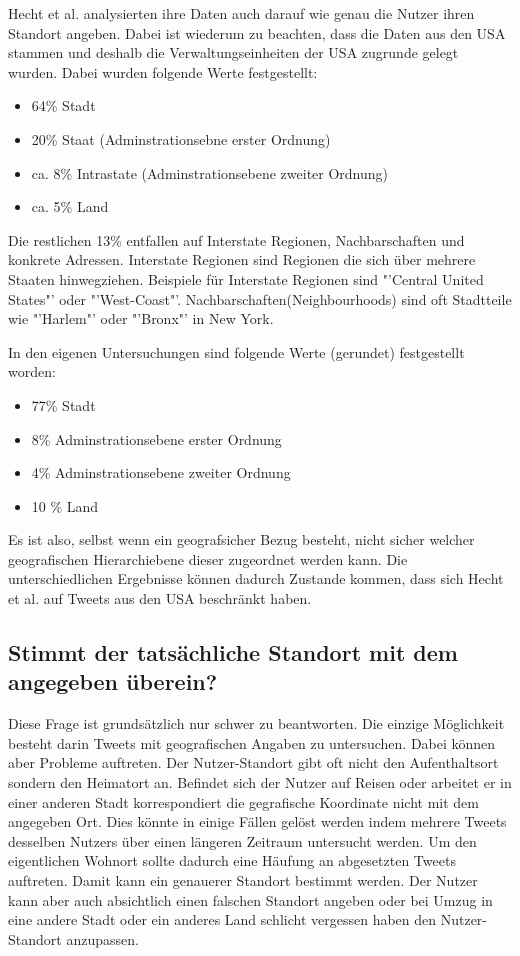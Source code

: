 			Hecht et al. analysierten ihre Daten auch darauf wie genau die Nutzer ihren Standort angeben.
			Dabei ist wiederum zu beachten, dass die Daten aus den USA stammen und deshalb die Verwaltungseinheiten der USA zugrunde gelegt wurden.
			Dabei wurden folgende Werte festgestellt:

			\begin{itemize}
			 	\item 64\% Stadt 
			 	\item 20\% Staat (Adminstrationsebne erster Ordnung) 
			 	\item ca. 8\% Intrastate (Adminstrationsebene zweiter Ordnung) 
			 	\item ca. 5\% Land 
			 \end{itemize} 

			 Die restlichen 13\% entfallen auf Interstate Regionen, Nachbarschaften und konkrete Adressen. 
			 Interstate Regionen sind Regionen die sich über mehrere Staaten hinwegziehen. 
			 Beispiele für Interstate Regionen sind "'Central United States"' oder "'West-Coast"'.
			 Nachbarschaften(Neighbourhoods) sind oft Stadtteile wie "'Harlem"' oder "'Bronx"' in New York.

			 In den eigenen Untersuchungen sind folgende Werte (gerundet) festgestellt worden:

			\begin{itemize}
			 	\item 77\% Stadt %
			 	\item 8\% Adminstrationsebene erster Ordnung %
			 	\item 4\% Adminstrationsebene zweiter Ordnung %
			 	\item 10 \% Land %
			 \end{itemize} 

			Es ist also, selbst wenn ein geografsicher Bezug besteht, nicht sicher welcher geografischen Hierarchiebene dieser zugeordnet werden kann. 
			Die unterschiedlichen Ergebnisse können dadurch Zustande kommen, dass sich Hecht et al. auf Tweets aus den USA beschränkt haben.  


		\subsection*{Stimmt der tatsächliche Standort mit dem angegeben überein?}

			Diese Frage ist grundsätzlich nur schwer zu beantworten.
			Die einzige Möglichkeit besteht darin Tweets mit geografischen Angaben zu untersuchen.
			Dabei können aber Probleme auftreten. 
			Der Nutzer-Standort gibt oft nicht den Aufenthaltsort sondern den Heimatort an. 
			Befindet sich der Nutzer auf Reisen oder arbeitet er in einer anderen Stadt korrespondiert die gegrafische Koordinate nicht mit dem angegeben Ort.
			Dies könnte in einige Fällen gelöst werden indem mehrere Tweets desselben Nutzers über einen längeren Zeitraum untersucht werden. 
			Um den eigentlichen Wohnort sollte dadurch eine Häufung an abgesetzten Tweets auftreten.
			Damit kann ein genauerer Standort bestimmt werden.
			Der Nutzer kann aber auch absichtlich einen falschen Standort angeben oder bei Umzug in eine andere Stadt oder ein anderes Land schlicht vergessen haben den Nutzer-Standort anzupassen.

